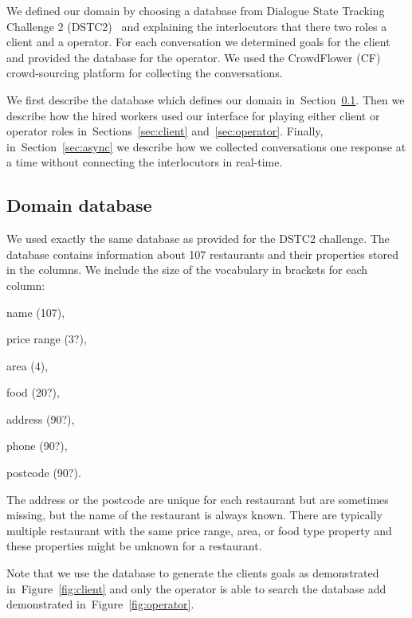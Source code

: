 \documentclass[runningheads,a4paper]{llncs}
\begin{document}
We defined our domain by choosing a database from Dialogue State Tracking Challenge 2 (DSTC2)~\cite{henderson2014dstc2} and explaining the interlocutors that there two roles a client and a operator.
For each conversation we determined goals for the client and provided the database for the operator.
We used the CrowdFlower (CF) crowd-sourcing platform for collecting the conversations.

We first describe the database which defines our domain in~Section~\ref{sec:db}.
Then we describe how the hired workers used our interface for playing either client or operator roles in~Sections~\ref{sec:client} and~\ref{sec:operator}.
Finally, in~Section~\ref{sec:async} we describe how we collected conversations one response at a time without connecting the interlocutors in real-time. 

\subsection{Domain database}
\label{sec:db}

We used exactly the same database as provided for the DSTC2 challenge.
The database contains information about 107 restaurants and their properties stored in the columns.
We include the size of the vocabulary in brackets for each column:
\begin{inparaenum}
    \item name (107),
    \item price range (3?),
    \item area (4),
    \item food (20?),
    \item address (90?),
    \item phone (90?),
    \item postcode (90?).
\end{inparaenum}

The address or the postcode are unique for each restaurant but are sometimes missing, but the name of the restaurant is always known. 
There are typically multiple restaurant with the same price range, area, or food type property and these properties might be unknown for a restaurant.

Note that we use the database to generate the clients goals as demonstrated in~Figure~\ref{fig:client} and only the operator is able to search the database add demonstrated in~Figure~\ref{fig:operator}.
\end{document}
